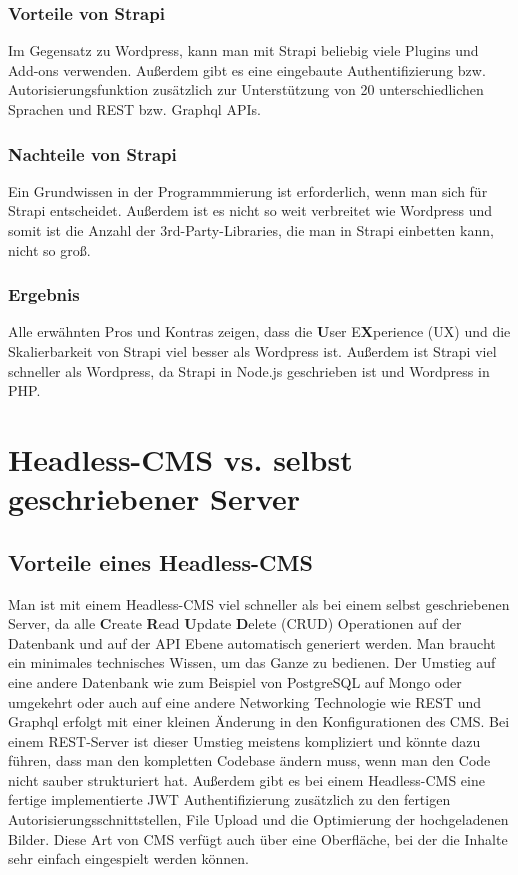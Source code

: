 \subsubsection{Vorteile von Strapi}

Im Gegensatz zu Wordpress, kann man mit Strapi beliebig viele Plugins und Add-ons
verwenden. Außerdem gibt es eine eingebaute Authentifizierung bzw. Autorisierungsfunktion
zusätzlich zur Unterstützung von 20 unterschiedlichen Sprachen und REST
bzw. Graphql APIs.
\cite{strapi-vs-wordpress}

\subsubsection{Nachteile von Strapi}
Ein Grundwissen in der Programmmierung ist erforderlich, wenn man sich für Strapi
entscheidet. Außerdem ist es nicht so weit verbreitet wie Wordpress und somit ist die Anzahl
der 3rd-Party-Libraries, die man in Strapi einbetten kann, nicht so groß.
\cite{strapi-vs-wordpress}

\subsubsection{Ergebnis}
Alle erwähnten Pros und Kontras zeigen, dass  die \textbf{U}ser E\textbf{X}perience (UX)
und die Skalierbarkeit von Strapi viel besser als Wordpress ist.
Außerdem ist Strapi viel schneller als Wordpress,
da Strapi in Node.js geschrieben ist und Wordpress in PHP.
\cite{strapi-vs-wordpress}



\section{Headless-CMS vs. selbst geschriebener Server}

\subsection{Vorteile eines Headless-CMS}
Man ist mit einem Headless-CMS viel schneller als bei einem selbst geschriebenen Server,
da alle \textbf{C}reate \textbf{R}ead \textbf{U}pdate \textbf{D}elete (CRUD) Operationen auf der Datenbank und auf der API Ebene automatisch generiert werden. Man braucht ein minimales technisches Wissen, um das Ganze zu bedienen.
Der Umstieg auf eine andere Datenbank wie zum Beispiel von PostgreSQL auf Mongo oder umgekehrt
oder auch auf eine andere Networking Technologie wie REST und Graphql
erfolgt mit einer kleinen Änderung in den Konfigurationen des CMS.
Bei einem REST-Server ist dieser Umstieg meistens kompliziert und könnte dazu führen,
dass man den kompletten Codebase ändern muss, wenn man den Code nicht sauber strukturiert hat.
Außerdem gibt es bei einem Headless-CMS eine fertige implementierte JWT Authentifizierung
zusätzlich zu den fertigen Autorisierungsschnittstellen,
File Upload und die Optimierung der hochgeladenen Bilder.
Diese Art von CMS verfügt auch über eine Oberfläche,
bei der die Inhalte sehr einfach eingespielt werden können.

